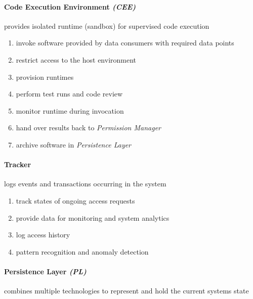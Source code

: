 \documentclass[12pt,english,a4paper,titlepage,cleardoublepage=empty,dottedtoc]{report}
\providecommand{\tightlist}{%
  \setlength{\itemsep}{0pt}\setlength{\parskip}{0pt}}
\begin{document}
\paragraph{\texorpdfstring{Code Execution Environment
\emph{(CEE)}}{Code Execution Environment (CEE)}}\label{code-execution-environment-cee}

provides isolated runtime (sandbox) for supervised code execution

\begin{enumerate}
\def\labelenumi{\alph{enumi})}
\tightlist
\item
  invoke software provided by data consumers with required data points
\item
  restrict access to the host environment
\item
  provision runtimes
\item
  perform test runs and code review
\item
  monitor runtime during invocation
\item
  hand over results back to \emph{Permission Manager}
\item
  archive software in \emph{Persistence Layer}
\end{enumerate}

\paragraph{Tracker}\label{tracker-1}

logs events and transactions occurring in the system

\begin{enumerate}
\def\labelenumi{\alph{enumi})}
\tightlist
\item
  track states of ongoing access requests
\item
  provide data for monitoring and system analytics
\item
  log access history
\item
  pattern recognition and anomaly detection
\end{enumerate}

\paragraph{\texorpdfstring{Persistence Layer
\emph{(PL)}}{Persistence Layer (PL)}}\label{persistence-layer-pl}

combines multiple technologies to represent and hold the current systems
state
\end{document}
